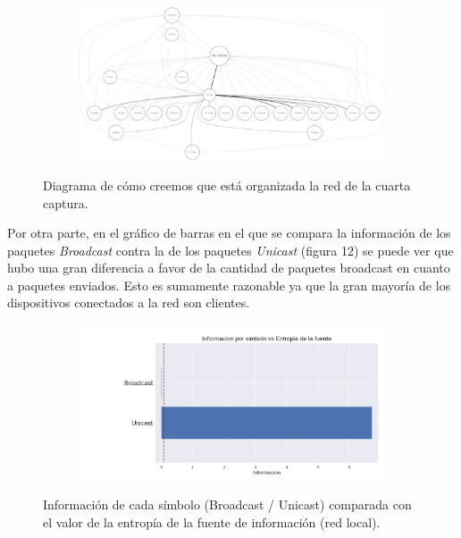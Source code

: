 \begin{figure}[ht]
  \hspace*{-0.5cm}
  \begin{subfigure}{1.1\textwidth}
    \includegraphics[width=\textwidth]{imagenes/mc/mcRed.png}
  \end{subfigure}
	\label{fig:exp4_grafo}
	\caption{Diagrama de cómo creemos que está organizada la red de la cuarta captura.}
\end{figure}

\par Por otra parte, en el gráfico de barras en el que se compara la información de los paquetes \textit{Broadcast} contra la de los paquetes \textit{Unicast} (figura 12) se puede ver que hubo una gran diferencia a favor de la cantidad de paquetes broadcast en cuanto a paquetes enviados. Esto es sumamente razonable ya que la gran mayoría de los dispositivos conectados a la red son clientes.

\begin{figure}[h]
  \begin{subfigure}{.5\textwidth}
    \includegraphics[width=\textwidth]{imagenes/mc/mcbrvsuni.png}
  \end{subfigure}
  \label{fig:exp4_univsbr_infovsentro}
  \caption{Información de cada símbolo (Broadcast / Unicast) comparada con el valor de la entropía de la fuente de información (red local).}
\end{figure}

